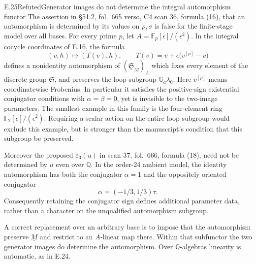 \begin{statement}{E.25}{Refuted}{Generator images do not determine the integral automorphism functor}
The assertion in \S51.2, fol.~665 verso, C4 scan 36, formula (16),
that an automorphism is determined by its values on
\(\rho,\sigma\) is false for the finite-stage model over all
bases.  For every prime \(p\), let
\(A=\mathbb F_p[\epsilon]/(\epsilon^2)\).  In the integral
cocycle coordinates of E.16, the formula
\[
 (v,h)\longmapsto(T(v),h),\qquad
 T(v)=v+\epsilon\bigl(v^{[p]}-v\bigr)                 \tag{E.25.1}
\]
defines a nonidentity automorphism of
\((\underline{\mathfrak S}_M)_A\) which fixes every element
of the discrete group \(\mathfrak S\), and preserves the
loop subgroup \(\mathbb G_a\lambda_0\).  Here \(v^{[p]}\)
means coordinatewise Frobenius.  In particular it satisfies
the positive-sign existential conjugator conditions with
\(\alpha=\beta=0\), yet is invisible to the two-image
parameters.  The smallest example in this family is the
four-element ring \(\mathbb F_2[\epsilon]/(\epsilon^2)\).
Requiring a scalar action on the entire loop subgroup would
exclude this example, but is stronger than the manuscript's
condition that this subgroup be preserved.

Moreover the proposed \(\varepsilon_3(u)\) in scan 37, fol.~666,
formula (18), need not be determined by \(u\) even over
\(\mathbb Q\).  In the order-24 ambient model, the identity
automorphism has both the conjugator \(\alpha=1\) and the
oppositely oriented conjugator
\[
       \alpha=(-1/3,1/3)\tau.
\]
Consequently retaining the conjugator sign defines additional
parameter data, rather than a character on the unqualified
automorphism subgroup.

A correct replacement over an arbitrary base is to impose
that the automorphism preserve \(\underline M\) and restrict
to an \(A\)-linear map there.  Within that subfunctor the
two generator images do determine the automorphism.
Over \(\mathbb Q\)-algebras linearity is automatic, as in E.24.
\end{statement}
